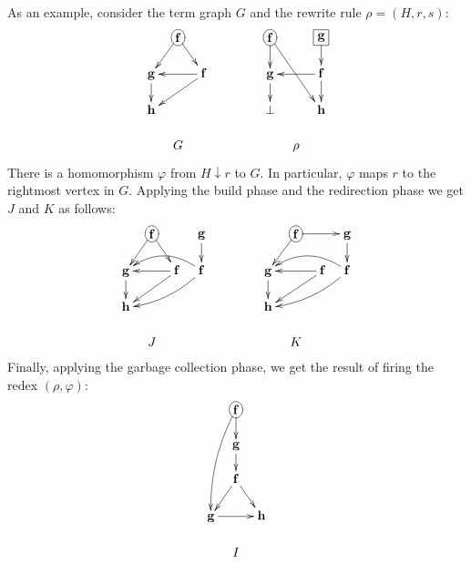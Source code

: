 \documentclass{LMCS}
\newcommand{\funone}{\mathbf{f}}
\newcommand{\funtwo}{\mathbf{g}}
\newcommand{\funthree}{\mathbf{h}}
\newcommand{\rootone}{r}
\newcommand{\roottwo}{s}
\newcommand{\tgone}{G}
\newcommand{\tgtwo}{H}
\newcommand{\tgthree}{J}
\newcommand{\tgfour}{K}
\newcommand{\rrone}{\rho}
\newcommand{\homone}{\varphi}
\newcommand{\subgr}[2]{#1\downarrow #2}
\begin{document}
As an example, consider the term graph $\tgone$ and the rewrite rule 
$\rrone=(\tgtwo,\rootone,\roottwo)$:
\begin{displaymath}
\xymatrix@R=15pt@C=8pt{
  &  *+[o][F]{\funone}\ar[dl]\ar[dr] &   \\
  \funtwo \ar[d] & & \funone \ar[ll]\ar[dll] \\
  \funthree & &  \\
  & \tgone & \\
}
\hspace{40pt}
\xymatrix@R=15pt@C=8pt{
 *+[o][F]{\funone} \ar[d]\ar[ddrr] & & *+[F]{\funtwo}\ar[d] \\
 \funtwo \ar[d] & & \funone\ar[ll]\ar[d] \\
\bot & & \funthree \\
 & \rrone & \\
}
\end{displaymath}
There is a homomorphism $\homone$ from
$\subgr{\tgtwo}{\rootone}$ to
$\tgone$. In particular, $\homone$ maps $\rootone$ to
the rightmost vertex in $\tgone$.
Applying the build phase and the redirection phase we get $\tgthree$
and $\tgfour$ as follows:
\begin{displaymath}
\xymatrix@R=15pt@C=8pt{
  &  *+[o][F]{\funone}\ar[dl]\ar[dr] & & \funtwo\ar[d]  \\
  \funtwo \ar[d] & & \funone \ar[ll]\ar[dll] & \funone\ar@/^/[dlll]\ar@/_1pc/[lll] \\
  \funthree & & & \\
  & \tgthree & & \\
}
\hspace{40pt}
\xymatrix@R=15pt@C=8pt{
  &  *+[o][F]{\funone}\ar[dl]\ar[rr] & & \funtwo\ar[d]  \\
  \funtwo \ar[d] & & \funone\ar[ll]\ar[dll] & \funone\ar@/^/[dlll]\ar@/_1pc/[lll] \\
  \funthree & & & \\
  & \tgfour & & \\
}
\end{displaymath}
Finally, applying the garbage collection phase, we get the
result of firing the redex $(\rrone,\homone)$:
\begin{displaymath}
\xymatrix@R=15pt@C=8pt{
 & *+[o][F]{\funone}\ar@/_/[dddl]\ar[d] & \\
 & \funtwo\ar[d] & \\
 & \funone\ar[dl]\ar[dr] & \\
 \funtwo\ar[rr] & & \funthree\\
 & I & \\
}
\end{displaymath}
\end{document}
